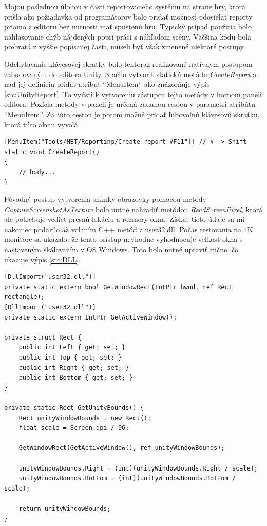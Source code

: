 \documentclass[slovak, bachelorpractice]{diploma}
\begin{document}
Mojou poslednou úlohou v časti reportovacieho systému na strane hry, ktorá prišla ako požiadavka od programátorov bolo pridať možnosť odosielať reporty priamo z editoru bez nutnosti mať spustenú hru. Typický prípad použitia bolo nahlasovanie chýb nájdených popri práci s náhľadom scény. Väčšina kódu bola prebratá z vyššie popísanej časti, museli byť však zmenené niektoré postupy. 

Odchytávanie klávesovej skratky bolo tentoraz realizované natívnym postupom zabudovaným do editora Unity. Stačilo vytvoriť statickú metódu \textit{CreateReport} a nad jej definíciu pridať atribút \enquote{MenuItem} ako znázorňuje výpis \ref{src:UnityReport}. To vyústi k vytvoreniu zástupcu tejto metódy v hornom paneli editora. Pozícia metódy v paneli je určená zadanou cestou v parametri atribútu \enquote{MenuItem}. Za túto cestou je potom možné pridať ľubovoľnú klávesovú skratku, ktorá túto akciu vyvolá.
\vspace{10pt}
\begin{lstlisting}[label=src:UnityReport,caption={Odchytenie stlačenia klávesovej skratky v editore Unity}]
[MenuItem("Tools/HBT/Reporting/Create report #F11")] // # -> Shift
static void CreateReport()
{
    // body...
}
\end{lstlisting}
\vspace{5pt}

Pôvodný postup vytvorenia snímky obrazovky pomocou metódy \textit{CaptureScreenshotAsTexture} bolo nutné nahradiť metódou \textit{ReadScreenPixel}, ktorá ale potrebuje vedieť presnú lokáciu a rozmery okna. Získať tieto údaje sa mi nakoniec podarilo až volaním C++ metód z user32.dll. Počas testovania na 4K monitore sa ukázalo, že tento prístup nevhodne vyhodnocuje veľkosť okna s nastaveným škálovaním v OS Windows. Toto bolo nutné upraviť ručne, čo ukazuje výpis \ref{src:DLL}.
\vspace{10pt}
\begin{lstlisting}[label=src:DLL,caption={Získanie veľkosti okna Unity editoru}]
[DllImport("user32.dll")]
private static extern bool GetWindowRect(IntPtr hwnd, ref Rect rectangle);
[DllImport("user32.dll")]
private static extern IntPtr GetActiveWindow();

private struct Rect {
    public int Left { get; set; }
    public int Top { get; set; }
    public int Right { get; set; }
    public int Bottom { get; set; }
}

private static Rect GetUnityBounds() {
    Rect unityWindowBounds = new Rect();
    float scale = Screen.dpi / 96;

    GetWindowRect(GetActiveWindow(), ref unityWindowBounds);

    unityWindowBounds.Right = (int)(unityWindowBounds.Right / scale);
    unityWindowBounds.Bottom = (int)(unityWindowBounds.Bottom / scale);
    
    return unityWindowBounds;
}
\end{lstlisting}
\end{document}
